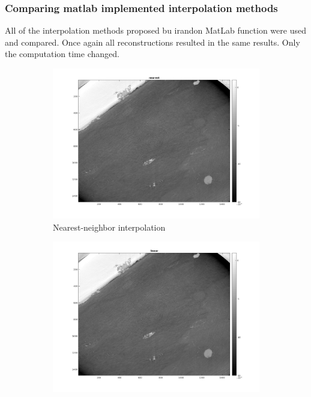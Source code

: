 \documentclass[10pt,a4paper,titlepage]{article}
\begin{document}
    \clearpage




		\subsubsection{Comparing matlab implemented interpolation methods}
			All of the interpolation methods proposed bu irandon MatLab function were used and compared. Once again all reconstructions resulted in the same results. Only the computation time changed.
			
		\begin{figure}[h!]
        \centering	
			\begin{subfigure}[b]{0.475\textwidth}
            \centering
            \includegraphics[width=\textwidth]{interp/nearest.png}  
            \caption{Nearest-neighbor interpolation} 
            \label{nearest}
        \end{subfigure}
        \hfill
        \begin{subfigure}[b]{0.475\textwidth}  
            \centering 
            \includegraphics[width=\textwidth]{interp/linear.png}   

\end{subfigure}
\end{figure}
\end{document}

